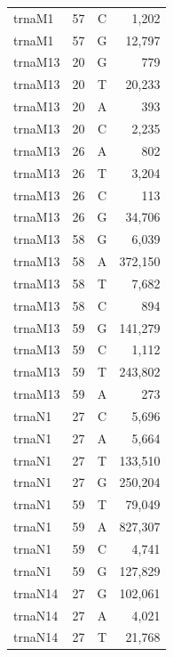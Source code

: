 \documentclass[12pt]{rockefeller}
\begin{document}
\begin{tiny}
\begin{longtable}{|l|r|c|r|}
  trnaM1 &        57 &          C &      1,202 \\
  trnaM1 &        57 &          G &     12,797 \\
 trnaM13 &        20 &          G &        779 \\
 trnaM13 &        20 &          T &     20,233 \\
 trnaM13 &        20 &          A &        393 \\
 trnaM13 &        20 &          C &      2,235 \\
 trnaM13 &        26 &          A &        802 \\
 trnaM13 &        26 &          T &      3,204 \\
 trnaM13 &        26 &          C &        113 \\
 trnaM13 &        26 &          G &     34,706 \\
 trnaM13 &        58 &          G &      6,039 \\
 trnaM13 &        58 &          A &    372,150 \\
 trnaM13 &        58 &          T &      7,682 \\
 trnaM13 &        58 &          C &        894 \\
 trnaM13 &        59 &          G &    141,279 \\
 trnaM13 &        59 &          C &      1,112 \\
 trnaM13 &        59 &          T &    243,802 \\
 trnaM13 &        59 &          A &        273 \\
  trnaN1 &        27 &          C &      5,696 \\
  trnaN1 &        27 &          A &      5,664 \\
  trnaN1 &        27 &          T &    133,510 \\
  trnaN1 &        27 &          G &    250,204 \\
  trnaN1 &        59 &          T &     79,049 \\
  trnaN1 &        59 &          A &    827,307 \\
  trnaN1 &        59 &          C &      4,741 \\
  trnaN1 &        59 &          G &    127,829 \\
 trnaN14 &        27 &          G &    102,061 \\
 trnaN14 &        27 &          A &      4,021 \\
 trnaN14 &        27 &          T &     21,768 \\

\end{longtable}
\end{tiny}
\end{document}
